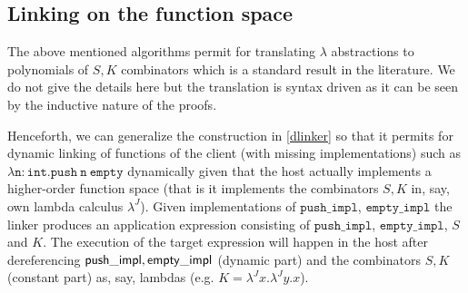 					\subsection{Linking on the function space}
					The above mentioned algorithms permit  for translating $\lambda$ abstractions to polynomials of $S,K$ combinators which is a standard result in the literature. We do not give the details here but the translation is  syntax driven as it can be seen by the inductive nature of the proofs.
					
					Henceforth, we can generalize the construction in \ref{dlinker} so that it permits for dynamic linking of functions of the client 
					(with missing implementations) such as  $\mathtt{\lambda n:int. push\  n\  empty}$ dynamically given that the host actually implements 
					a higher-order function space (that is it implements the combinators $S,K$ in, say, own lambda calculus $\lambda^{J}$).
					Given implementations of $\mathtt{push\_impl}$, $\mathtt{empty\_impl}$ the linker produces an application expression 
					consisting of $\mathtt{push\_impl}$, $\mathtt{empty\_impl}$, $S$ and $K$.  
					The execution of the target expression will happen in the host after dereferencing  ${\sf push\_impl, empty\_impl}$ (dynamic part) 
					and the combinators $S,K$ (constant part) as, say, lambdas (e.g. $K=\lambda^{J} x.\lambda^{J} y. x$).
					
